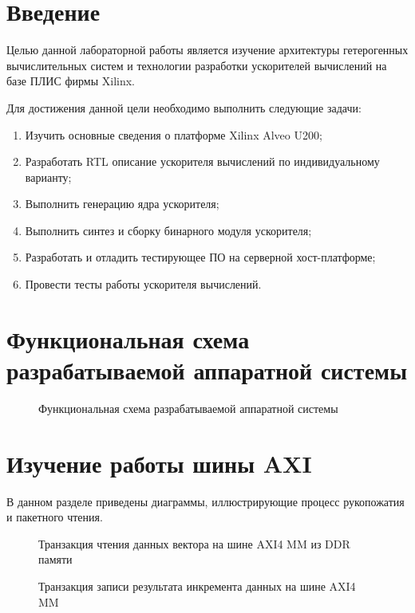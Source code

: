 \chapter{Введение}
Целью данной лабораторной работы является изучение архитектуры гетерогенных вычислительных систем и технологии разработки ускорителей вычислений на базе ПЛИС фирмы Xilinx.

Для достижения данной цели необходимо выполнить следующие задачи:
\begin{enumerate}
	\item Изучить основные сведения о платформе Xilinx Alveo U200;
	\item Разработать RTL описание ускорителя вычислений по индивидуальному варианту;
	\item Выполнить генерацию ядра ускорителя;
	\item Выполнить синтез и сборку бинарного модуля ускорителя;
	\item Разработать и отладить тестирующее ПО на серверной хост-платформе;
	\item Провести тесты работы ускорителя вычислений.
\end{enumerate}

\chapter{Функциональная схема разрабатываемой аппаратной системы}
\begin{figure}[ph!]
	\caption{Функциональная схема разрабатываемой аппаратной системы}
\end{figure}

\chapter{Изучение работы шины AXI}

В данном разделе приведены диаграммы, иллюстрирующие процесс рукопожатия и пакетного чтения.

\begin{figure}[ph!]
	\caption{Транзакция чтения данных вектора на шине AXI4 MM из DDR памяти}
\end{figure}

\begin{figure}[ph!]
	\caption{Транзакция записи результата инкремента данных на шине AXI4 MM}
\end{figure}

